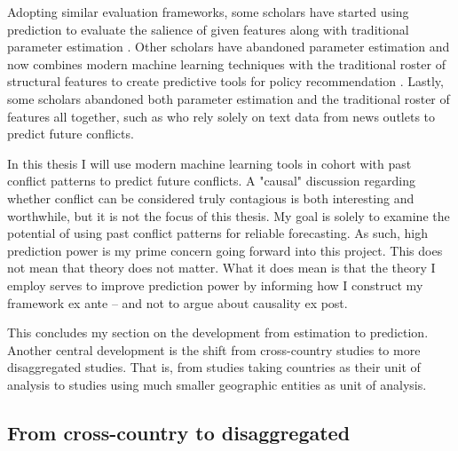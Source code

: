 \documentclass[a4paper]{article}
\begin{document}
Adopting similar evaluation frameworks, some scholars have started using prediction to evaluate the salience of given features along with traditional parameter estimation \citep{Goldstone_2010}. Other scholars have abandoned parameter estimation and now combines modern machine learning techniques with the traditional roster of structural features to create predictive tools for policy recommendation \citep{perry_2013}. Lastly, some scholars abandoned both parameter estimation and the traditional roster of features all together, such as \cite{mueller_2016} who rely solely on text data from news outlets to predict future conflicts.\par

In this thesis I will use modern machine learning tools in cohort with past conflict patterns to predict future conflicts. A "causal" discussion regarding whether conflict can be considered truly contagious is both interesting and worthwhile, but it is not the focus of this thesis. My goal is solely to examine the potential of using past conflict patterns for reliable forecasting. As such, high prediction power is my prime concern going forward into this project. This does not mean that theory does not matter. What it does mean is that the theory I employ serves to improve prediction power by informing how I construct my framework ex ante -- and not to argue about causality ex post.\par 

This concludes my section on the development from estimation to prediction. Another central development is the shift from cross-country studies to more disaggregated studies. That is, from studies taking countries as their unit of analysis to studies using much smaller geographic entities as unit of analysis.\par


\subsection{From cross-country to disaggregated} %

\end{document}

